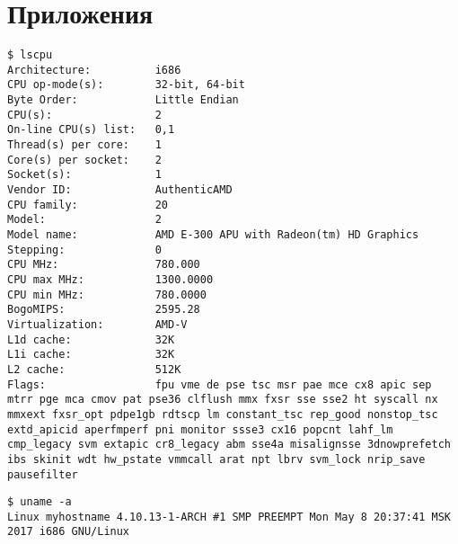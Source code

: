 \section{Приложения}







\begin{lstlisting}[caption=\texttt{lscpu}, label=app:lscpu]
$ lscpu
Architecture:          i686
CPU op-mode(s):        32-bit, 64-bit
Byte Order:            Little Endian
CPU(s):                2
On-line CPU(s) list:   0,1
Thread(s) per core:    1
Core(s) per socket:    2
Socket(s):             1
Vendor ID:             AuthenticAMD
CPU family:            20
Model:                 2
Model name:            AMD E-300 APU with Radeon(tm) HD Graphics
Stepping:              0
CPU MHz:               780.000
CPU max MHz:           1300.0000
CPU min MHz:           780.0000
BogoMIPS:              2595.28
Virtualization:        AMD-V
L1d cache:             32K
L1i cache:             32K
L2 cache:              512K
Flags:                 fpu vme de pse tsc msr pae mce cx8 apic sep mtrr pge mca cmov pat pse36 clflush mmx fxsr sse sse2 ht syscall nx mmxext fxsr_opt pdpe1gb rdtscp lm constant_tsc rep_good nonstop_tsc extd_apicid aperfmperf pni monitor ssse3 cx16 popcnt lahf_lm cmp_legacy svm extapic cr8_legacy abm sse4a misalignsse 3dnowprefetch ibs skinit wdt hw_pstate vmmcall arat npt lbrv svm_lock nrip_save pausefilter
\end{lstlisting}

\begin{lstlisting}[caption=\texttt{uname}, label=app:uname]
$ uname -a
Linux myhostname 4.10.13-1-ARCH #1 SMP PREEMPT Mon May 8 20:37:41 MSK 2017 i686 GNU/Linux
\end{lstlisting}

\clearpage
